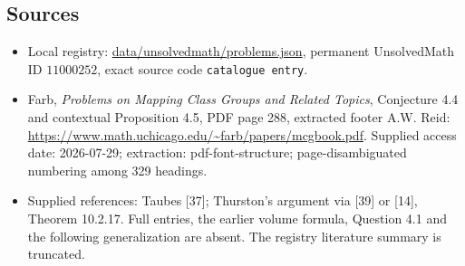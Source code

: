 \documentclass[11pt]{article}
\begin{document}
\subsection{Sources}
\begin{itemize}
\item Local registry: \url{data/unsolvedmath/problems.json}, permanent UnsolvedMath ID $11000252$, exact source code \texttt{catalogue entry}.
\item Farb, \emph{Problems on Mapping Class Groups and Related Topics}, Conjecture 4.4 and contextual Proposition 4.5, PDF page 288, extracted footer A.W. Reid: \url{https://www.math.uchicago.edu/~farb/papers/mcgbook.pdf}. Supplied access date: 2026-07-29; extraction: pdf-font-structure; page-disambiguated numbering among 329 headings.
\item Supplied references: Taubes [37]; Thurston's argument via [39] or [14], Theorem 10.2.17. Full entries, the earlier volume formula, Question 4.1 and the following generalization are absent. The registry literature summary is truncated.
\end{itemize}
\end{document}

